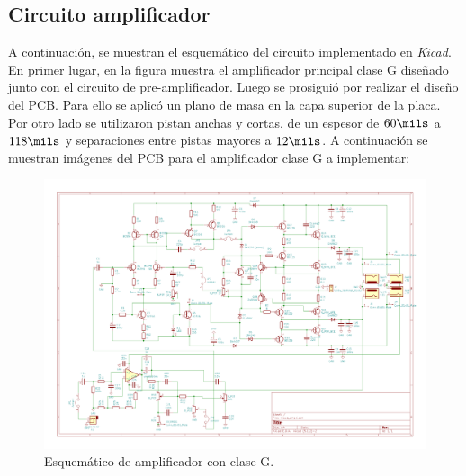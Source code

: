 \subsection{Circuito amplificador}


\par A continuación, se muestran el esquemático del circuito implementado en \textit{Kicad}. En primer lugar, en la figura  muestra el amplificador principal clase G diseñado junto con el circuito de pre-amplificador. Luego se prosiguió por realizar el diseño del PCB. Para ello se aplicó un plano de masa en la capa superior de la placa. Por otro lado se utilizaron pistan anchas y cortas, de un espesor de $60 \si[per-mode=symbol]{\mils}$ a $118 \si[per-mode=symbol]{\mils}$ y separaciones entre pistas mayores a $12 \si[per-mode=symbol]{\mils}$. A continuación se muestran imágenes del PCB para el amplificador clase G a implementar:\\


\vfill

\clearpage



\begin{figure}[H]
        \centering
        \includegraphics[scale=0.32, angle=90]{img/circuito/kicad.png}
        \caption{Esquemático de amplificador con clase G.}
        \label{fig::ampli_kicad}
\end{figure}

